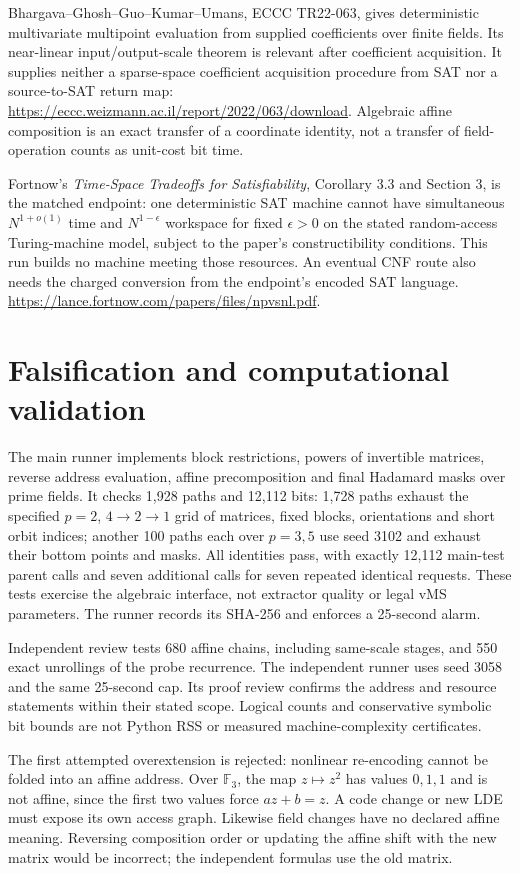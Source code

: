 \documentclass[11pt]{article}
\begin{document}
Bhargava--Ghosh--Guo--Kumar--Umans, ECCC TR22-063, gives deterministic
multivariate multipoint evaluation from supplied coefficients over finite
fields. Its near-linear input/output-scale theorem is relevant after
coefficient acquisition. It supplies neither a sparse-space coefficient
acquisition procedure from SAT nor a source-to-SAT return map:
\url{https://eccc.weizmann.ac.il/report/2022/063/download}.
Algebraic affine composition is an exact transfer of a coordinate
identity, not a transfer of field-operation counts as unit-cost bit time.

Fortnow's \emph{Time-Space Tradeoffs for Satisfiability}, Corollary 3.3
and Section 3, is the matched endpoint: one deterministic SAT machine
cannot have simultaneous $N^{1+o(1)}$ time and $N^{1-\epsilon}$ workspace
for fixed $\epsilon>0$ on the stated random-access Turing-machine model,
subject to the paper's constructibility conditions. This run builds no
machine meeting those resources. An eventual CNF route also needs the
charged conversion from the endpoint's encoded SAT language.
\url{https://lance.fortnow.com/papers/files/npvsnl.pdf}.

\section*{Falsification and computational validation}
The main runner implements block restrictions, powers of invertible
matrices, reverse address evaluation, affine precomposition and final
Hadamard masks over prime fields. It checks 1,928 paths and 12,112 bits:
1,728 paths exhaust the specified $p=2$, $4\to2\to1$ grid of matrices,
fixed blocks, orientations and short orbit indices; another 100 paths
each over $p=3,5$ use seed 3102 and exhaust their bottom points and masks.
All identities pass, with exactly 12,112 main-test parent calls and seven
additional calls for seven repeated identical requests. These tests
exercise the algebraic interface, not extractor quality or legal vMS
parameters. The runner records its SHA-256 and enforces a 25-second alarm.

Independent review tests 680 affine chains, including same-scale stages,
and 550 exact unrollings of the probe recurrence. The independent runner
uses seed 3058 and the same 25-second cap. Its proof review confirms the
address and resource statements within their stated scope. Logical
counts and conservative symbolic bit bounds are not Python RSS or
measured machine-complexity certificates.

The first attempted overextension is rejected: nonlinear re-encoding
cannot be folded into an affine address. Over $\mathbb F_3$, the map
$z\mapsto z^2$ has values $0,1,1$ and is not affine, since the first
two values force $az+b=z$. A code change or new LDE must expose its own
access graph. Likewise field changes have no declared affine meaning.
Reversing composition order or updating the affine shift with the new
matrix would be incorrect; the independent formulas use the old matrix.
\end{document}
